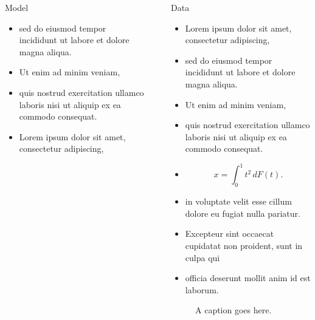 \documentclass[12pt, final]{beamer}
\newlength{\sepwid}
\newlength{\onecolwid}
\newlength{\twocolwid}
\begin{document}
\begin{frame}[t]
\begin{columns}[t]
\begin{column}{\onecolwid}
\begin{block}{Model}
\begin{itemize}
          \item sed do eiusmod tempor incididunt ut labore et dolore magna aliqua.
          \item Ut enim ad minim veniam,
          \item quis nostrud exercitation ullamco laboris nisi ut aliquip ex ea commodo consequat.
          \item Lorem ipsum \alert{dolor} sit amet, consectetur adipiscing,
        \end{itemize}
      \end{block}
    \end{column}
    \begin{column}{\sepwid}\end{column}
    \begin{column}{\twocolwid}
      \begin{block}{Data}
        \begin{itemize}
          \item Lorem ipsum \alert{dolor} sit amet, consectetur adipiscing,
          \item sed do eiusmod tempor incididunt ut labore et dolore magna aliqua.
          \item Ut enim ad minim veniam,
          \item quis nostrud exercitation ullamco laboris nisi ut aliquip ex ea commodo consequat.
          \item $$x = \int_0^1 t^2 \,dF(t).$$
          \item in voluptate velit \alert{esse cillum dolore} eu fugiat nulla pariatur.
          \item Excepteur sint occaecat cupidatat non proident, sunt in culpa qui
          \item officia deserunt mollit anim id est laborum.
        \end{itemize}
        \vskip1in
        \begin{figure}
          \label{fig:pic}
          \caption{A caption goes here.}
        \end{figure}
      \end{block}


\end{column}
\end{columns}
\end{frame}
\end{document}

